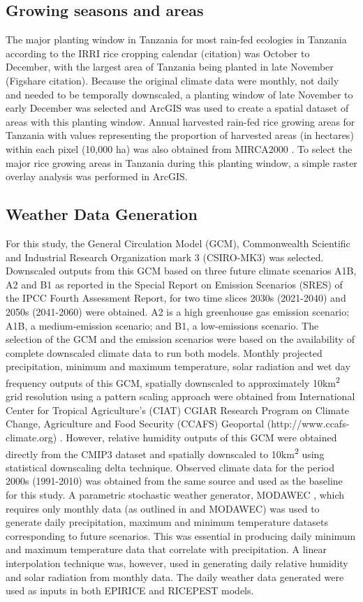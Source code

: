\documentclass[preprint,review,12pt]{elsarticle}
\begin{document}
    \subsection{Growing seasons and areas}
    The major planting window in Tanzania for most rain-fed ecologies in Tanzania according to the IRRI rice cropping calendar (citation) was October to December, with the largest area of Tanzania being planted in late November (Figshare citation). Because the original climate data were monthly, not daily and needed to be temporally downscaled, a planting window of late November to early December was selected and ArcGIS was used to create a spatial dataset of areas with this planting window. Annual harvested rain-fed rice growing areas for Tanzania with values representing the proportion of harvested areas (in hectares) within each pixel (10,000 ha) was also obtained from MIRCA2000 \cite{Portmann2010}. To select the major rice growing areas in Tanzania during this planting window, a simple raster overlay analysis was performed in ArcGIS.
    
    \subsection{Weather Data Generation}
    For this study, the General Circulation Model (GCM), Commonwealth Scientific and Industrial Research Organization mark 3 (CSIRO-MK3) was selected. Downscaled outputs from this GCM based on three future climate scenarios A1B, A2 and B1 as reported in the Special Report on Emission Scenarios (SRES) of the IPCC Fourth Assessment Report, for two time slices 2030s (2021-2040) and 2050s (2041-2060) were obtained. A2 is a high greenhouse gas emission scenario; A1B, a medium-emission scenario; and B1, a low-emissions scenario. The selection of the GCM and the emission scenarios were based on the availability of complete downscaled climate data to run both models. Monthly projected precipitation, minimum and maximum temperature, solar radiation and wet day frequency outputs of this GCM, spatially downscaled to approximately 10km\textsuperscript{2} grid resolution using a pattern scaling approach were obtained from International Center for Tropical Agriculture's (CIAT) CGIAR Research Program on Climate Change, Agriculture and Food Security (CCAFS) Geoportal (http://www.ccafs-climate.org) \cite{Jones2009}. However, relative humidity outputs of this GCM were obtained directly from the CMIP3 dataset and spatially downscaled to 10km\textsuperscript{2} using statistical downscaling delta technique. Observed climate data for the period 2000s (1991-2010) was obtained from the same source and used as the baseline for this study. A parametric stochastic weather generator, MODAWEC \cite{Liu2009}, which requires only monthly data (as outlined in \citet{Geng1986} and MODAWEC) was used to generate daily precipitation, maximum and minimum temperature datasets corresponding to future scenarios. This was essential in producing daily minimum and maximum temperature data that correlate with precipitation. A linear interpolation technique was, however, used in generating daily relative humidity and solar radiation from monthly data. The daily weather data generated were used as inputs in both EPIRICE and RICEPEST models.
    
\end{document}
